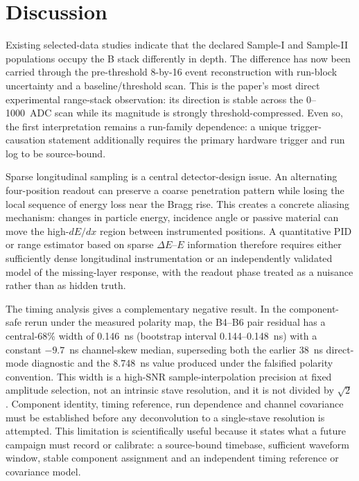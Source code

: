 \section{Discussion}

Existing selected-data studies indicate that the declared Sample-I and Sample-II populations occupy the B stack differently in depth. The difference has now been carried through the pre-threshold 8-by-16 event reconstruction with run-block uncertainty and a baseline/threshold scan. This is the paper's most direct experimental range-stack observation: its direction is stable across the 0--1000~ADC scan while its magnitude is strongly threshold-compressed. Even so, the first interpretation remains a run-family dependence: a unique trigger-causation statement additionally requires the primary hardware trigger and run log to be source-bound.

Sparse longitudinal sampling is a central detector-design issue. An alternating four-position readout can preserve a coarse penetration pattern while losing the local sequence of energy loss near the Bragg rise. This creates a concrete aliasing mechanism: changes in particle energy, incidence angle or passive material can move the high-\(dE/dx\) region between instrumented positions. A quantitative PID or range estimator based on sparse \(\Delta E\)--\(E\) information therefore requires either sufficiently dense longitudinal instrumentation or an independently validated model of the missing-layer response, with the readout phase treated as a nuisance rather than as hidden truth.

The timing analysis gives a complementary negative result. In the component-safe rerun under the measured polarity map, the B4--B6 pair residual has a central-68\% width of 0.146~ns (bootstrap interval 0.144--0.148~ns) with a constant $-9.7$~ns channel-skew median, superseding both the earlier 38~ns direct-mode diagnostic and the 8.748~ns value produced under the falsified polarity convention. This width is a high-SNR sample-interpolation precision at fixed amplitude selection, not an intrinsic stave resolution, and it is not divided by $\sqrt{2}$. Component identity, timing reference, run dependence and channel covariance must be established before any deconvolution to a single-stave resolution is attempted. This limitation is scientifically useful because it states what a future campaign must record or calibrate: a source-bound timebase, sufficient waveform window, stable component assignment and an independent timing reference or covariance model.

